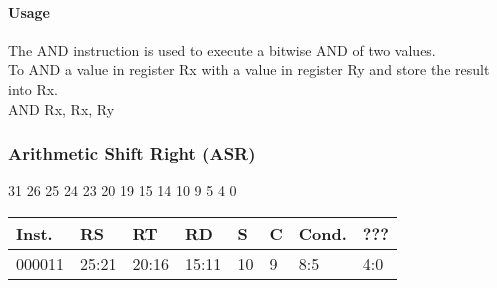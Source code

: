 \documentclass[12pt]{article}
\begin{document}
    \paragraph{Usage}
    \begin{flushleft}
    The AND instruction is used to execute a bitwise AND of two values.\\
    \vspace{1em}
    To AND a value in register Rx with a value in register Ry and store the result into Rx.\\
    \vspace{1em}
    AND Rx, Rx, Ry
    \end{flushleft}
   
   




    \newpage
    \subsubsection{Arithmetic Shift Right (ASR)}
    
    \hspace{1.6cm}31 \hspace{1.2cm}26 \hspace{.075cm}25 \hspace{.15cm}24 \hspace{.075cm}23 \hspace{.875cm}20 \hspace{.04cm}19 \hspace{.8cm}15 \hspace{.04cm}14 \hspace{.8cm}10 \hspace{.04cm}9 \hspace{1.15cm}5 \hspace{.04cm}4 \hspace{1.25cm}0
    \vspace{-.25cm}
    \begin{center}
        \begin{tabular}{ |p{1.8cm}|p{1.5cm}|p{1.5cm}|p{1.5cm}|p{0.3cm}|p{0.3cm}|p{1.5cm}|p{1.5cm}| }
            \hline
            \textbf{Inst.} & \textbf{RS}& \textbf{RT} & \textbf{RD} & \textbf{S} & \textbf{C} & \textbf{Cond.} & ???\\
            \hline
            000011& 25:21 & 20:16 & 15:11 & 10 & 9 & 8:5 &4:0\\
            \hline
        \end{tabular}
    \end{center}
    
\end{document}
